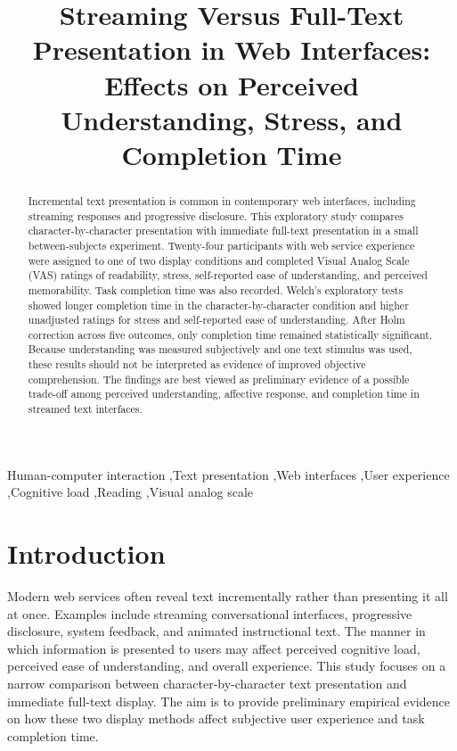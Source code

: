 \documentclass[authoryear]{elsarticle}
\title{Streaming Versus Full-Text Presentation in Web Interfaces: Effects on Perceived Understanding, Stress, and Completion Time}
\author{}
\begin{document}
\begin{abstract}
  Incremental text presentation is common in contemporary web interfaces, including streaming responses and progressive disclosure. This exploratory study compares character-by-character presentation with immediate full-text presentation in a small between-subjects experiment. Twenty-four participants with web service experience were assigned to one of two display conditions and completed Visual Analog Scale (VAS) ratings of readability, stress, self-reported ease of understanding, and perceived memorability. Task completion time was also recorded. Welch's exploratory tests showed longer completion time in the character-by-character condition and higher unadjusted ratings for stress and self-reported ease of understanding. After Holm correction across five outcomes, only completion time remained statistically significant. Because understanding was measured subjectively and one text stimulus was used, these results should not be interpreted as evidence of improved objective comprehension. The findings are best viewed as preliminary evidence of a possible trade-off among perceived understanding, affective response, and completion time in streamed text interfaces.
\end{abstract}

\begin{keyword}
  Human-computer interaction \sep Text presentation \sep Web interfaces \sep User experience \sep Cognitive load \sep Reading \sep Visual analog scale
\end{keyword}

\maketitle

\section{Introduction}
Modern web services often reveal text incrementally rather than presenting it all at once. Examples include streaming conversational interfaces, progressive disclosure, system feedback, and animated instructional text. The manner in which information is presented to users may affect perceived cognitive load, perceived ease of understanding, and overall experience. This study focuses on a narrow comparison between character-by-character text presentation and immediate full-text display. The aim is to provide preliminary empirical evidence on how these two display methods affect subjective user experience and task completion time.
\end{document}
